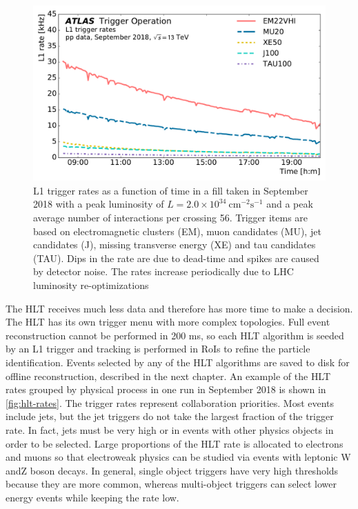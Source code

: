 \begin{figure}[!h]
\centering
\includegraphics[width=.6\textwidth]{figures/Detector/l1-rates.pdf}
\caption{\ac{L1} trigger rates as a function of time in a fill taken in September 2018 with a peak luminosity of $L = 2.0 \times 10^{34}~\text{cm}^{-2}\text{s}^{-1}$ and a peak average number of interactions per crossing 56. Trigger items are based on electromagnetic clusters (EM), muon candidates (MU), jet candidates (J), missing transverse energy (XE) and tau candidates (TAU). Dips in the rate are due to dead-time and spikes are caused by detector noise. The rates increase periodically due to LHC luminosity re-optimizations \cite{trigger-public}}
\label{fig:l1-rates}
\end{figure}

The \ac{HLT} receives much less data and therefore has more time to make a decision. The \ac{HLT} has its own trigger menu with more complex topologies. Full event reconstruction cannot be performed in 200 ms, so each \ac{HLT} algorithm is seeded by an \ac{L1} trigger and tracking is performed in \acp{RoI} to refine the particle identification. Events selected by any of the \ac{HLT} algorithms are saved to disk for offline reconstruction, described in the next chapter. An example of the \ac{HLT} rates grouped by physical process in one run in September 2018 is shown in \autoref{fig:hlt-rates}. The trigger rates represent collaboration priorities. Most events include jets, but the jet triggers do not take the largest fraction of the trigger rate. In fact, jets must be very high \pt or in events with other physics objects in order to be selected. Large proportions of the \ac{HLT} rate is allocated to electrons and muons so that electroweak physics can be studied via events with leptonic W andZ boson decays. In general, single object triggers have very high \pt thresholds because they are more common, whereas multi-object triggers can select lower energy events while keeping the rate low.

